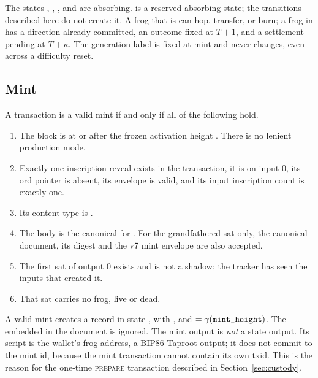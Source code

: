 The states , , , and  are
absorbing.  is a reserved absorbing state; the transitions
described here do not create it. A frog that is  can hop,
transfer, or burn; a frog in  has a direction already
committed, an outcome fixed at $T+1$, and a settlement pending at
$T+\kappa$. The generation label  is fixed at mint and never
changes, even across a difficulty reset.

\subsection{Mint}

A transaction is a valid mint if and only if all of the following hold.

\begin{enumerate}[leftmargin=1.7em,itemsep=0.25em]
  \item The block is at or after the frozen activation height
        . There is no lenient production mode.
  \item Exactly one inscription reveal exists in the transaction, it is on
        input 0, its ord pointer is absent, its envelope is valid, and its
        input inscription count is exactly one.
  \item Its content type is .
  \item The body is the canonical  for
        . For the grandfathered sat only,
        the canonical  document, its digest and the
        v7 mint envelope are also accepted.
  \item The first sat of output 0 exists and is not a shadow; the tracker has
        seen the inputs that created it.
  \item That sat carries no frog, live or dead.
\end{enumerate}

A valid mint creates a record in state , with ,
 and
 $= \gamma(\code{mint_height})$. The  embedded in the
document is ignored. The mint output is \emph{not} a state output. Its script
is the wallet's frog address, a BIP86 Taproot output; it does not commit to
the mint id, because the mint transaction cannot contain its own txid. This
is the reason for the one-time \textsc{prepare} transaction described in
Section~\ref{sec:custody}.


